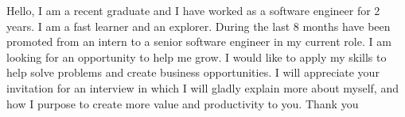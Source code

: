 Hello, I am a recent graduate and I have worked as a software engineer for 2 years. I am a fast learner and an explorer. During the last 8 months have been promoted from an intern to a senior software engineer in my current role. I am looking for an opportunity to help me grow. I would like to apply my skills to help solve problems and create business opportunities. I will appreciate your invitation for an interview in which I will gladly explain more about myself, and how I purpose to create more value and productivity to you. Thank you